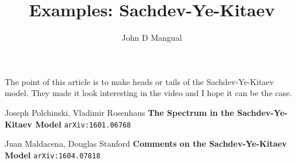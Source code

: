 \documentclass[12pt]{article}
\title{\textbf{ Examples: Sachdev-Ye-Kitaev}}
\author{John D Mangual}
\date{}
\begin{document}
\selectfont \fontsize{25}{30}\selectfont

\maketitle

\selectfont \fontsize{12}{10}\selectfont

\noindent The point of this article is to make heads or tails of the Sachdev-Ye-Kitaev model.  They made it look interesting in the video and I hope it can be the case.  

\newpage

\selectfont \fontsize{12}{10}\selectfont

\begin{thebibliography}{}

\item Joseph Polchinski, Vladimir Rosenhaus \textbf{The Spectrum in the Sachdev-Ye-Kitaev Model} \texttt{arXiv:1601.06768}

\item Juan Maldacena, Douglas Stanford \textbf{Comments on the Sachdev-Ye-Kitaev Model} \texttt{arXiv:1604.07818}

\end{thebibliography}
\end{document}
